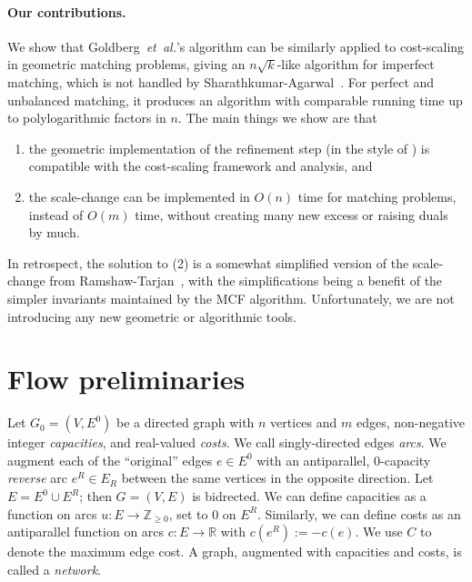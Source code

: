 \documentclass[11pt]{article}
\def\etal{\textsl{et~al.}}
\theoremstyle{plain}
\begin{document}
\paragraph{Our contributions.}

We show that Goldberg~{\etal}'s algorithm can be similarly applied to cost-scaling
in geometric matching problems, giving an $n\sqrt{k}$-like algorithm for imperfect matching, 
which is not handled by Sharathkumar-Agarwal~\cite{DBLP:conf/soda/SharathkumarA12}.
For perfect and unbalanced matching, it produces an algorithm with comparable running time
up to polylogarithmic factors in $n$.
The main things we show are that
\begin{enumerate}
	\item the geometric implementation of the refinement step 
		(in the style of \cite{DBLP:conf/soda/SharathkumarA12})
		is compatible with the \cite{DBLP:journals/mst/GoldbergHKT17} 
		cost-scaling framework and analysis, and
	\item the scale-change can be implemented in $O(n)$ time for matching problems, 
		instead of $O(m)$ time, without creating many new excess or raising duals by much.
\end{enumerate}
In retrospect, the solution to (2) is a somewhat simplified version of the scale-change from 
Ramshaw-Tarjan~\cite{DBLP:conf/focs/RamshawT12}, with the simplifications being a benefit
of the simpler invariants maintained by the MCF algorithm.
Unfortunately, we are not introducing any new geometric or algorithmic tools.


\section{Flow preliminaries}
\label{section:preliminaries}

Let $G_0 = (V, E^0)$ be a directed graph with $n$ vertices and $m$ edges,
non-negative integer \emph{capacities}, and real-valued \emph{costs}. 
We call singly-directed edges \emph{arcs}.
We augment each of the ``original'' edges $e \in E^0$ with an antiparallel, 
0-capacity \emph{reverse} arc $e^R \in E_R$
between the same vertices in the opposite direction.
Let $E = E^0 \cup E^R$; then $G = (V, E)$ is bidrected.
We can define capacities as a function on arcs
$u: E \to \mathbb{Z}_{\geq 0}$, set to 0 on $E^R$.
Similarly, we can define costs as an antiparallel function on arcs
$c: E \to \mathbb{R}$ with $c(e^R) := - c(e)$.
We use $C$ to denote the maximum edge cost.
A graph, augmented with capacities and costs, is called a \emph{network}.
\end{document}
